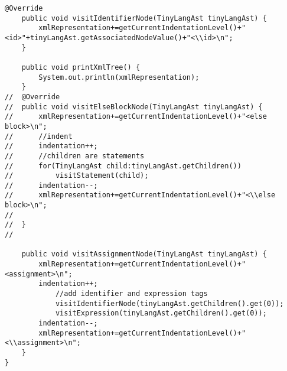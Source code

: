 \begin{lstlisting}[basicstyle=\miniscule,caption=Generating an XML representation of AST,label=listing:xmlGeneration]
	@Override
	public void visitIdentifierNode(TinyLangAst tinyLangAst) {
		xmlRepresentation+=getCurrentIndentationLevel()+"<id>"+tinyLangAst.getAssociatedNodeValue()+"<\\id>\n";							
	}
	
	public void printXmlTree() {
		System.out.println(xmlRepresentation);
	}
//	@Override
//	public void visitElseBlockNode(TinyLangAst tinyLangAst) {
//		xmlRepresentation+=getCurrentIndentationLevel()+"<else block>\n";			
//		//indent
//		indentation++;
//		//children are statements
//		for(TinyLangAst child:tinyLangAst.getChildren())
//			visitStatement(child);
//		indentation--;
//		xmlRepresentation+=getCurrentIndentationLevel()+"<\\else block>\n";			
//				
//	}
//

	public void visitAssignmentNode(TinyLangAst tinyLangAst) {		
		xmlRepresentation+=getCurrentIndentationLevel()+"<assignment>\n";			
		indentation++;
			//add identifier and expression tags
			visitIdentifierNode(tinyLangAst.getChildren().get(0));
			visitExpression(tinyLangAst.getChildren().get(0));
		indentation--;
		xmlRepresentation+=getCurrentIndentationLevel()+"<\\assignment>\n";					
	}
}
\end{lstlisting}
